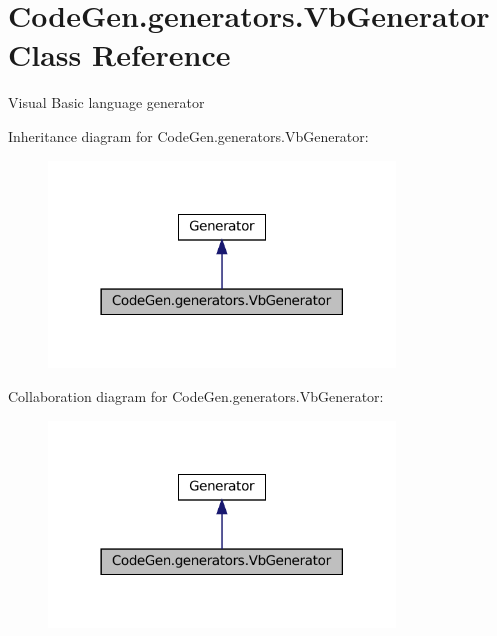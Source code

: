 \hypertarget{classCodeGen_1_1generators_1_1VbGenerator}{}\section{Code\+Gen.\+generators.\+Vb\+Generator Class Reference}
\label{classCodeGen_1_1generators_1_1VbGenerator}


Visual Basic language generator  




Inheritance diagram for Code\+Gen.\+generators.\+Vb\+Generator\+:
\nopagebreak
\begin{figure}[H]
\begin{center}
\leavevmode
\includegraphics[width=261pt]{classCodeGen_1_1generators_1_1VbGenerator__inherit__graph}
\end{center}
\end{figure}


Collaboration diagram for Code\+Gen.\+generators.\+Vb\+Generator\+:
\nopagebreak
\begin{figure}[H]
\begin{center}
\leavevmode
\includegraphics[width=261pt]{classCodeGen_1_1generators_1_1VbGenerator__coll__graph}
\end{center}
\end{figure}
